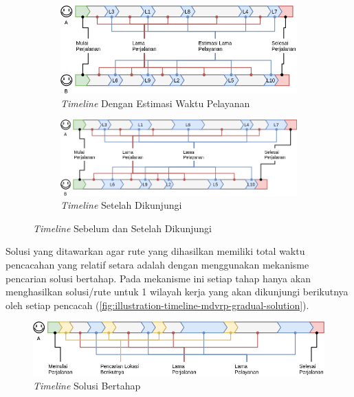 \begin{figure}[!]
	\centering
	\begin{subfigure}[t]{12.5cm}
		\centering
		\includegraphics[width=\textwidth]{Resources/Images/illustration-timeline-mdvrp-timeservice-estimation}
		\caption{\textit{Timeline} Dengan Estimasi Waktu Pelayanan}
		\label{fig:illustration-timeline-mdvrp-timeservice-estimation}
	\end{subfigure}%
	
	\begin{subfigure}[t]{\textwidth}
		\centering
		\includegraphics[width=\textwidth]{Resources/Images/illustration-timeline-mdvrp-timeservice-real}
		\caption{\textit{Timeline} Setelah Dikunjungi}
		\label{fig:illustration-timeline-mdvrp-timeservice-real}
	\end{subfigure}%
	\caption{\textit{Timeline} Sebelum dan Setelah Dikunjungi}
	\label{fig:illustration-timeline-mdvrp}
\end{figure}


Solusi yang ditawarkan agar rute yang dihasilkan memiliki total waktu pencacahan yang relatif setara adalah dengan menggunakan mekanisme pencarian solusi bertahap. Pada mekanisme ini setiap tahap hanya akan menghasilkan solusi/rute untuk 1 wilayah kerja yang akan dikunjungi berikutnya oleh setiap pencacah (\autoref{fig:illustration-timeline-mdvrp-gradual-solution}). 


\begin{figure}[!]
	\centering
	\includegraphics[width=\textwidth]{Resources/Images/illustration-timeline-mdvrp-gradual-solution}
	\caption{\textit{Timeline} Solusi Bertahap}
	\label{fig:illustration-timeline-mdvrp-gradual-solution}
\end{figure}


